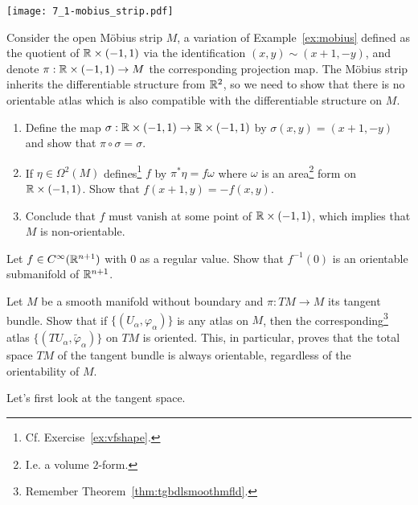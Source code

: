 \begin{marginfigure}
  \texttt{[image: 7\_1-mobius\_strip.pdf]}
\end{marginfigure}

\begin{exercise}
  Consider the open M\"obius strip $M$, a variation of Example~\ref{ex:mobius} defined as the quotient of $\mathbb{R}\times(-1,1)$ via the identification $(x,y) \sim (x+1, -y)$, and denote $\pi: \mathbb{R}\times(-1,1)\to M$ the corresponding projection map.
  The M\"obius strip inherits the differentiable structure from $\mathbb{R}^2$, so we need to show that there is no orientable atlas which is also compatible with the differentiable structure on $M$.
  \begin{enumerate}
    \item Define the map $\sigma:\mathbb{R}\times(-1,1)\to\mathbb{R}\times(-1,1)$ by $\sigma(x,y) = (x+1, -y)$ and show that $\pi\circ\sigma = \sigma$.
    \item If $\eta\in\Omega^2(M)$ defines\footnote{Cf. Exercise~\ref{ex:vfshape}.} $f$ by $\pi^* \eta = f \omega$ where $\omega$ is an area\footnote{I.e. a volume $2$-form.} form on $\mathbb{R}\times(-1,1)$.
    Show that $f(x+1, y) = - f(x,y)$.
    \item Conclude that $f$ must vanish at some point of $\mathbb{R}\times(-1,1)$, which implies that $M$ is non-orientable.
  \end{enumerate}
\end{exercise}

\begin{exercise}
  Let $f\in C^\infty(\mathbb{R}^{n+1})$ with $0$ as a regular value.
  Show that $f^{-1}(0)$ is an orientable submanifold of $\mathbb{R}^{n+1}$.
\end{exercise}

\begin{exercise}[\textit{[homework 4]}]\label{ex:TMorient}
  Let $M$ be a smooth manifold without boundary and $\pi: TM \to M$ its tangent bundle.
  Show that if $\{(U_\alpha,\varphi_\alpha)\}$ is any atlas on $M$, then the corresponding\footnote{Remember Theorem~\ref{thm:tgbdlsmoothmfld}.} atlas $\{(TU_\alpha, \widetilde\varphi_\alpha)\}$ on $TM$ is oriented.
  This, in particular, proves that the total space $TM$ of the tangent bundle is always orientable, regardless of the orientability of $M$.
\end{exercise}

Let's first look at the tangent space. 


